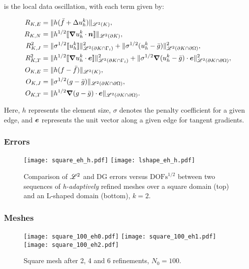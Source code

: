 is the local data oscillation, with each term given by:

\begin{align}
	R_{K, E} &= \lVert h (\bar{f} + \Delta u^k_h) \rVert_{\mathscr{L}^2(K)}, \\
	R_{K, N} &= \lVert h^{1/2} \llbracket \bm{\nabla} u^k_h \cdot \bm{n} \rrbracket \rVert_{\mathscr{L}^2(\partial K)}, \\
	R^2_{K, J} &= \lVert \sigma^{1/2} \llbracket u^k_h \rrbracket \rVert^2_{\mathscr{L}^2(\partial K \cap \Gamma_{i})} + \lVert \sigma^{1/2} (u^k_h - \bar{g}) \rVert^2_{\mathscr{L}^2(\partial K \cap \partial \Omega)}, \\
	R^2_{K, T} &= \lVert h^{1/2} \llbracket \bm{\nabla} u^k_h \cdot \bm{e} \rrbracket \rVert^2_{\mathscr{L}^2(\partial K \cap \Gamma_{i})} + \lVert \sigma^{1/2} \bm{\nabla} (u^k_h - \bar{g}) \cdot \bm{e} \rVert^2_{\mathscr{L}^2(\partial K \cap \partial \Omega)}, \\
	O_{K, E} &= \lVert h (f - \bar{f}) \rVert_{\mathscr{L}^2(K)}, \\
	O_{K, J} &= \lVert \sigma^{1/2} (g - \bar{g}) \rVert_{\mathscr{L}^2(\partial K \cap \partial \Omega)}, \\
	O_{K, T} &= \lVert h^{1/2} \bm{\nabla} (g - \bar{g}) \cdot \bm{e} \rVert_{\mathscr{L}^2(\partial K \cap \partial \Omega)}.
\end{align}

Here, $h$ represents the element size, $\sigma$ denotes the penalty coefficient for a given edge, and $\bm{e}$ represents the unit vector along a given edge for tangent gradients.

\newpage
\subsubsection{Errors}

\begin{figure}[!ht]
	\centering
	\texttt{[image: square\_eh\_h.pdf]}
    \texttt{[image: lshape\_eh\_h.pdf]}
	\caption{Comparison of $\mathscr{L}^2$ and DG errors versus $\text{DOFs}^{1/2}$ between two sequences of \textit{h-adaptively} refined meshes over a square domain (top) and an L-shaped domain (bottom), $k = 2$.}
\end{figure}

\newpage
\subsubsection{Meshes}

\begin{figure}[!ht]
	\centering
	\texttt{[image: square\_100\_eh0.pdf]}
    \texttt{[image: square\_100\_eh1.pdf]}
    \texttt{[image: square\_100\_eh2.pdf]}
	\caption{Square mesh after 2, 4 and 6 refinements, $N_0 = 100$.}
\end{figure}

